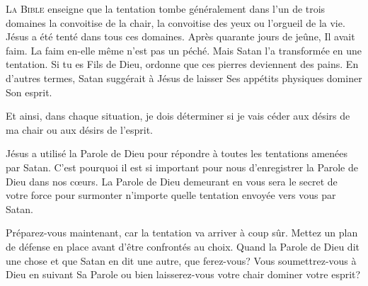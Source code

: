 





\lettrine[findent=-0.1em]{L}{a Bible} enseigne que la tentation  tombe généralement
 dans l'un de trois domaines\frcolon{} la convoitise de la chair,
 la convoitise des yeux ou l'orgueil de la vie. Jésus a été tenté
 dans tous ces domaines. Après quarante jours de jeûne, Il avait faim.
 La faim en-elle même n'est pas un péché. Mais Satan l'a transformée
 en une tentation. \Og Si tu es Fils de Dieu, ordonne que ces pierres
 deviennent des pains. \Fg{} 
 En d'autres termes, Satan suggérait à Jésus de laisser
 Ses appétits physiques dominer Son esprit. 


Et ainsi, dans chaque situation, je dois déterminer si je vais céder
 aux désirs de ma chair ou aux désirs de l'esprit. 

Jésus a utilisé la Parole de Dieu pour répondre à toutes les tentations
 amenées par Satan. C'est pourquoi il est si important pour nous d'enregistrer
 la Parole de Dieu dans nos c\oe{}urs. La Parole de Dieu demeurant en vous
 sera le secret de votre force pour surmonter n'importe quelle tentation
 envoyée vers vous par Satan. 

Préparez-vous maintenant, car la tentation va arriver à coup sûr.
 Mettez un plan de défense en place avant d'être confrontés au choix.
 Quand la Parole de Dieu dit une chose et que Satan en dit une autre,
 que ferez-vous? Vous soumettrez-vous à Dieu en suivant Sa Parole
 ou bien laisserez-vous votre chair dominer votre esprit? 

\dvrule


